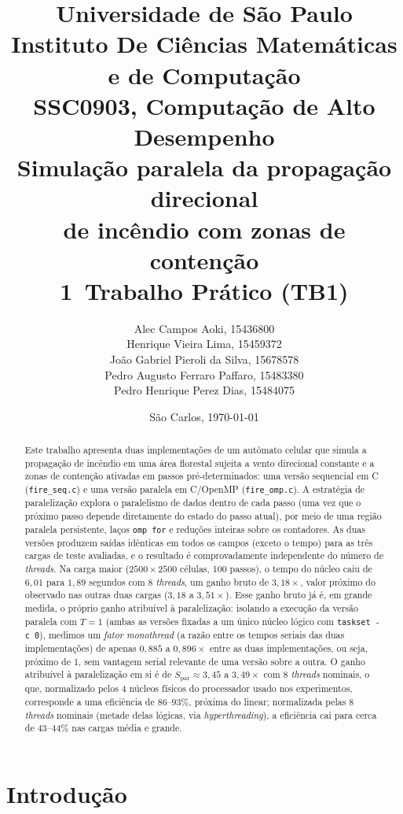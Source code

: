 \documentclass[11pt,a4paper]{article}
\title{\vspace{-1.5cm}
  \large Universidade de São Paulo\\
  \large Instituto De Ciências Matemáticas e de Computação\\
  \large SSC0903, Computação de Alto Desempenho\\[0.6cm]
  \textbf{\Large Simulação paralela da propagação direcional\\de incêndio com zonas de contenção}\\[0.2cm]
  \normalsize 1\textordmasculine \, Trabalho Prático (TB1)}
\author{
  Alec Campos Aoki, 15436800 \\
  Henrique Vieira Lima, 15459372 \\
  João Gabriel Pieroli da Silva, 15678578 \\
  Pedro Augusto Ferraro Paffaro, 15483380 \\
  Pedro Henrique Perez Dias, 15484075 \\
}
\date{São Carlos, \today}
\newcommand{\pct}{\%}
\begin{document}
\maketitle

\begin{abstract}
\noindent
Este trabalho apresenta duas implementações de um autômato celular que simula a propagação de incêndio em uma área florestal sujeita a vento direcional constante e a zonas de contenção ativadas em passos pré-determinados: uma versão sequencial em C (\texttt{fire\_seq.c}) e uma versão paralela em C/OpenMP (\texttt{fire\_omp.c}). A estratégia de paralelização explora o paralelismo de dados dentro de cada passo (uma vez que o próximo passo depende diretamente do estado do passo atual), por meio de uma região paralela persistente, laços \texttt{omp for} e reduções inteiras sobre os contadores. As duas versões produzem saídas idênticas em todos os campos (exceto o tempo) para as três cargas de teste avaliadas, e o resultado é comprovadamente independente do número de \emph{threads}. Na carga maior ($2500 \times 2500$ células, 100 passos), o tempo do núcleo caiu de $6{,}01$ para $1{,}89$ segundos com 8 \emph{threads}, um ganho bruto de $3{,}18\times$, valor próximo do observado nas outras duas cargas ($3{,}18$ a $3{,}51\times$). Esse ganho bruto já é, em grande medida, o próprio ganho atribuível à paralelização: isolando a execução da versão paralela com $T=1$ (ambas as versões fixadas a um único núcleo lógico com \texttt{taskset -c 0}), medimos um \emph{fator monothread} (a razão entre os tempos seriais das duas implementações) de apenas $0{,}885$ a $0{,}896\times$ entre as duas implementações, ou seja, próximo de 1, sem vantagem serial relevante de uma versão sobre a outra. O ganho atribuível à paralelização em si é de $S_\text{par} \approx 3{,}45$ a $3{,}49\times$ com 8 \emph{threads} nominais, o que, normalizado pelos 4 núcleos físicos do processador usado nos experimentos, corresponde a uma eficiência de $86$--$93\pct$, próxima do linear; normalizada pelas 8 \emph{threads} nominais (metade delas lógicas, via \emph{hyperthreading}), a eficiência cai para cerca de $43$--$44\pct$ nas cargas média e grande.
\end{abstract}

\tableofcontents
\vspace{0.5cm}

\section{Introdução}
\label{sec:intro}
\end{document}
